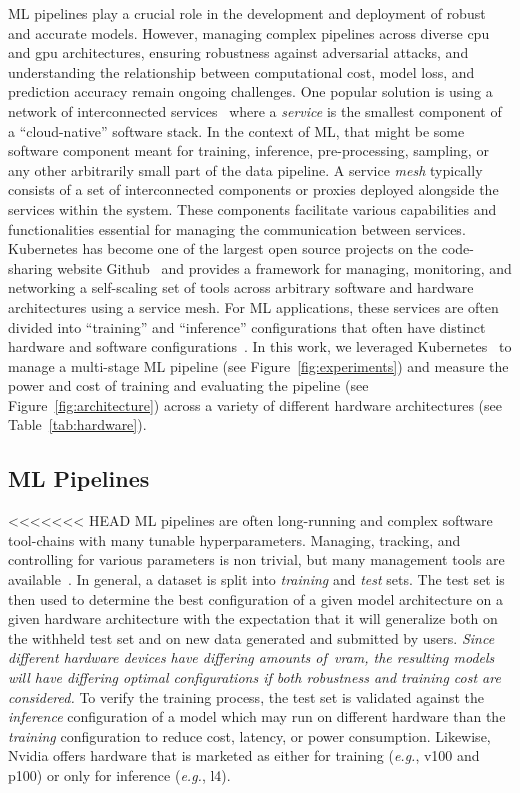 \documentclass[sn-mathphys-num]{sn-jnl}%
\newcommand{\cm}[1]{\textit{{\color{blue}#1}}}
\begin{document}
ML pipelines play a crucial role in the development and deployment of robust and accurate models. However, managing complex pipelines across diverse \acrfull{cpu} and \acrfull{gpu}  architectures, ensuring robustness against adversarial attacks, and understanding the relationship between computational cost, model loss, and prediction accuracy remain ongoing challenges.
One popular solution is using a network of interconnected services~\cite{panchal2024reusable,hasselbring2017microservice,zhou2022online,singh2023load} where a \textit{service} is the smallest component of a ``cloud-native'' software stack. In the context of ML, that might be some software component meant for training, inference, pre-processing, sampling, or any other arbitrarily small part of the data pipeline.
A service \textit{mesh} typically consists of a set of interconnected components or proxies deployed alongside the services within the system.  These components facilitate various capabilities and functionalities essential for managing the communication between services. Kubernetes has become one of the largest open source projects on the code-sharing website Github~\cite{k8s-size} and provides a framework for managing, monitoring, and networking a self-scaling set of tools across arbitrary software and hardware architectures using a service mesh. For ML applications, these services are often divided into ``training'' and ``inference'' configurations that often have distinct hardware and software configurations~\cite{wang2019benchmarking}. In this work, we leveraged Kubernetes~\cite{k8s} to manage a multi-stage ML pipeline (see Figure~\ref{fig:experiments}) and measure the power and cost of training and evaluating the pipeline (see Figure~\ref{fig:architecture}) across a variety of different hardware architectures (see Table~\ref{tab:hardware}).


\subsection{ML Pipelines}
\label{ml_pipelines}
<<<<<<< HEAD
ML pipelines are often long-running and complex software tool-chains with many tunable hyperparameters.
Managing, tracking, and controlling for various parameters is non trivial, but many management tools are available~\cite{dvc,hydra,k8s}.
In general, a dataset is split into \textit{training} and \textit{test} sets. The test set is then used to determine the best configuration of a given model architecture on a given hardware architecture with the expectation that it will generalize both on the withheld test set and on new data generated and submitted by users.
\cm{Since different hardware devices have differing amounts of~\acrfull{vram}, the resulting models will have differing optimal configurations if both robustness and training cost are considered.}
To verify the training process, the test set is validated against the \textit{inference} configuration of a model which may run on different hardware than the \textit{training} configuration to reduce cost, latency, or power consumption. Likewise, Nvidia offers hardware that is marketed as either for training (\textit{e.g.}, v100 and p100) or only for inference (\textit{e.g.}, l4).
\end{document}
